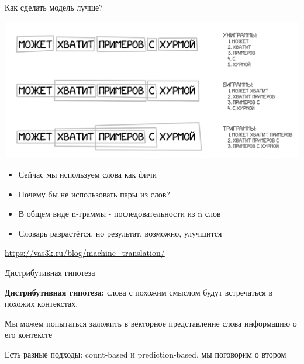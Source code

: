\documentclass[notes,12pt, aspectratio=169]{beamer}
\newenvironment{wideitemize}{\itemize\addtolength{\itemsep}{10pt}}{\enditemize}
\begin{document}
\begin{frame}{Как сделать модель лучше?}
	\begin{center}
		\includegraphics[width=.65\linewidth]{hurma.png}
	\end{center}
	\begin{itemize} 
		\item  Сейчас мы используем слова как фичи
		\item Почему бы не использовать пары из слов? 
		\item В общем виде n-граммы - последовательности из n слов
		\item Словарь разрастётся, но результат, возможно, улучшится
	\end{itemize}
\vfill
\footnotesize  {\color{blue} \url{https://vas3k.ru/blog/machine_translation/}}
\end{frame} 



\begin{frame}{Дистрибутивная гипотеза}
	\begin{wideitemize} 
		\item \textbf{Дистрибутивная гипотеза:} слова с похожим смыслом будут встречаться в похожих контекстах.
		\item Мы можем попытаться заложить в векторное представление слова информацию о его контексте
		\item Есть разные подходы: count-based и \alert{prediction-based,} мы поговорим о втором
	\end{wideitemize}
\end{frame} 
\end{document}
